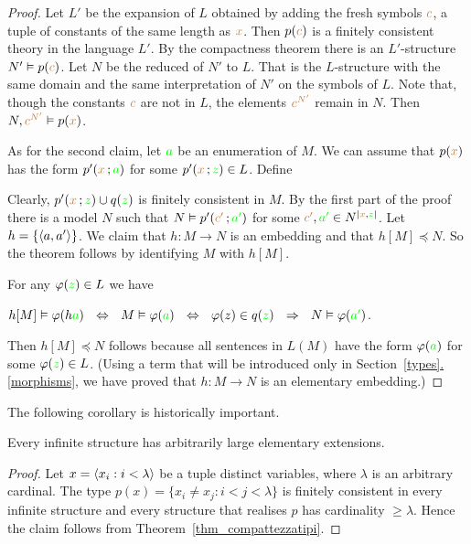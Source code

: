 \documentclass[creche.tex]{subfiles}
\begin{document}
\begin{proof}
 
Let $L'$ be the expansion of $L$ obtained by adding the fresh symbols ${\color{brown} c}$, a tuple of constants of the same length as ${\color{brown} x}$. Then $p({\color{brown} c})$ is a finitely consistent theory in the language $L'$. By the compactness theorem there is an $L'$-structure $N'\vDash p({\color{brown} c})$. Let $N$ be the reduced of $N'$ to $L$. That is the $L$-structure with the same domain and the same interpretation of $N'$ on the symbols of $L$. Note that, though the constants ${\color{brown} c}$ are not in $L$, the elements ${\color{brown} c^{N'}}$ remain in $N$. Then $N,{\color{brown} c^{N'}}\vDash p({\color{brown} x})$.  

As for the second claim, let ${\color{green} a}$ be an enumeration of $M$. We can assume that $p({\color{brown} x})$ has the form $p'({\color{brown} x}\,;{\color{green} a})$ for some $p'({\color{brown} x}\,;{\color{green} z})\in L$. Define


Clearly, $p'({\color{brown} x}\,;{\color{green} z})\cup q({\color{green} z})$ is finitely consistent in $M$. By the first part of the proof there is a model $N$ such that $N\vDash p'({\color{brown} c'}\,;{\color{green} a'})$ for some ${\color{brown} c'},{\color{green} a'}\in N^{|{\color{brown} x},{\color{green} z}|}$. Let $h=\{\langle a,a'\rangle\}$. We claim that $h:M\to N$ is an embedding and that $h[M]\preceq N$. So the theorem follows by identifying $M$ with $h[M]$. 

For any $\varphi({\color{green} z})\in L$ we have


\hfil $h[M]\models\phi(h{\gr a})\ \ \IFF\ \  M\models \phi({\gr a})\ \  \IFF\ \  \phi(z)\in q({\gr z})\ \   \IMP\ \  N\models \phi({\gr a'})$.

Then $h[M]\preceq N$ follows because all sentences in $L(M)$ have the form $\varphi({\color{green} a})$ for some $\varphi({\color{green} z})\in L$. (Using a term that will be introduced only in Section~\hyperref[morphisms]{\ref*{types}.\ref*{morphisms}}, we have proved that  $h:M\to N$ is an elementary embedding.)
\end{proof}

The following corollary is historically important.

\begin{void_thm}
Every infinite structure has arbitrarily large elementary extensions.
\end{void_thm}

\begin{proof}
Let $x=\langle x_i:i<\lambda\rangle$ be a tuple distinct variables, where $\lambda$ is an arbitrary cardinal. The type $p(x)=\big\{x_i\neq x_j: i<j<\lambda\big\}$ is finitely consistent in every infinite structure and every structure that realises $p$ has cardinality $\ge\lambda$. Hence the claim follows from Theorem~\ref{thm_compattezzatipi}.
\end{proof}
\end{document}
